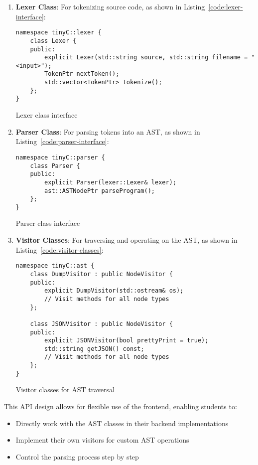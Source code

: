 \begin{enumerate}
    \item \textbf{Lexer Class}: For tokenizing source code, as shown in Listing~\ref{code:lexer-interface}:
\begin{listing}[ht!]
\begin{verbatim}
namespace tinyC::lexer {
    class Lexer {
    public:
        explicit Lexer(std::string source, std::string filename = "<input>");
        TokenPtr nextToken();
        std::vector<TokenPtr> tokenize();
    };
}
\end{verbatim}
\caption{Lexer class interface}
\label{code:lexer-interface}
\end{listing}

    \item \textbf{Parser Class}: For parsing tokens into an AST, as shown in Listing~\ref{code:parser-interface}:
\begin{listing}[ht!]
\begin{verbatim}
namespace tinyC::parser {
    class Parser {
    public:
        explicit Parser(lexer::Lexer& lexer);
        ast::ASTNodePtr parseProgram();
    };
}
\end{verbatim}
\caption{Parser class interface}
\label{code:parser-interface}
\end{listing}

    \item \textbf{Visitor Classes}: For traversing and operating on the AST, as shown in Listing~\ref{code:visitor-classes}:
\begin{listing}[ht!]
\begin{verbatim}
namespace tinyC::ast {
    class DumpVisitor : public NodeVisitor {
    public:
        explicit DumpVisitor(std::ostream& os);
        // Visit methods for all node types
    };
    
    class JSONVisitor : public NodeVisitor {
    public:
        explicit JSONVisitor(bool prettyPrint = true);
        std::string getJSON() const;
        // Visit methods for all node types
    };
}
\end{verbatim}
\caption{Visitor classes for AST traversal}
\label{code:visitor-classes}
\end{listing}
\end{enumerate}

This API design allows for flexible use of the frontend, enabling students to:
\begin{itemize}
    \item Directly work with the AST classes in their backend implementations
    \item Implement their own visitors for custom AST operations
    \item Control the parsing process step by step
\end{itemize}

